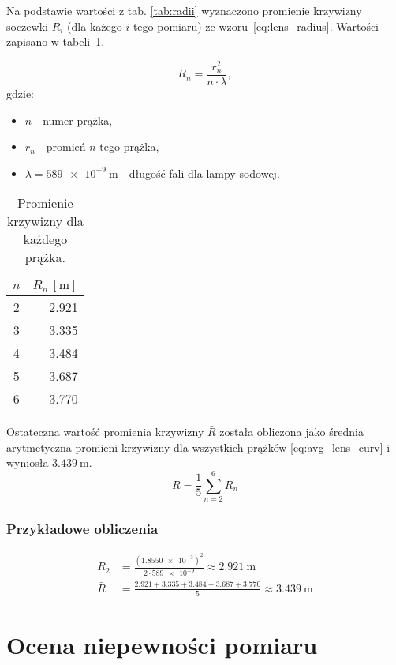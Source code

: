 \documentclass[a4paper,12pt]{article}
\begin{document}
Na podstawie wartości z tab. \ref{tab:radii} wyznaczono promienie krzywizny soczewki $R_i$ (dla każego $i$-tego pomiaru) ze wzoru~\eqref{eq:lens_radius}. Wartości zapisano w tabeli~\ref{tab:radii_and_curvature}.

\begin{equation}
    \label{eq:lens_radius}
    R_n = \frac{r_n^2}{n \cdot \lambda},
\end{equation}
gdzie:
\begin{itemize}
    \item $n$ - numer prążka,
    \item $r_n$ - promień $n$-tego prążka,
    \item $\lambda = \SI{589e-9}{\meter}$ - długość fali dla lampy sodowej.
\end{itemize}

\begin{table}[H]
    \centering
    \begin{tabular}{|c|r|}
        \hline
        \textbf{$n$} & \textbf{$R_n\,[\si{\meter}]$} \\ \hline
        \num{2} & \num{2.921} \\ \hline
        \num{3} & \num{3.335} \\ \hline
        \num{4} & \num{3.484} \\ \hline
        \num{5} & \num{3.687} \\ \hline
        \num{6} & \num{3.770} \\ \hline
    \end{tabular}
    \caption{Promienie krzywizny dla każdego prążka.}
    \label{tab:radii_and_curvature}
\end{table}

Ostateczna wartość promienia krzywizny $\bar R$ została obliczona jako średnia arytmetyczna promieni krzywizny dla wszystkich prążków \eqref{eq:avg_lens_curv} i wyniosła $\SI{3.439}{\meter}$.
\begin{equation}
    \label{eq:avg_lens_curv}
    \bar R =  \frac{1}{5}\sum\limits_{n=2}^{6} R_n
\end{equation}

\subsubsection*{Przykładowe obliczenia}

\begin{align*}
    R_2     & = \frac{(\num{1.8550e-3})^2}{2 \cdot \num{589e-9}}  \approx \SI{2.921}{\meter}                             \\
    \bar{R} & = \frac{\num{2.921} + \num{3.335} + \num{3.484} + \num{3.687} + \num{3.770}}{5} \approx \SI{3.439}{\meter}
\end{align*}

\section{Ocena niepewności pomiaru}





\end{document}
